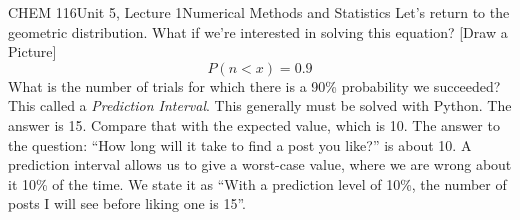 \documentclass{article}
\begin{document}
\begin{tdoc}{CHEM 116}{Unit 5, Lecture 1}{Numerical Methods and Statistics}
Let's return to the geometric distribution. What if we're interested
in solving this equation? [Draw a Picture]
\[
P(n < x) = 0.9
\] 
What is the number of trials for which there is a 90\% probability we
succeeded? This called a \emph{Prediction Interval}. This generally
must be solved with Python. The answer is 15. Compare that with the
expected value, which is 10. The answer to the question: ``How long
will it take to find a post you like?'' is about 10. A prediction
interval allows us to give a worst-case value, where we are wrong
about it 10\% of the time. We state it as ``With a prediction level of
10\%, the number of posts I will see before liking one is 15''.


\end{tdoc}
\end{document}
